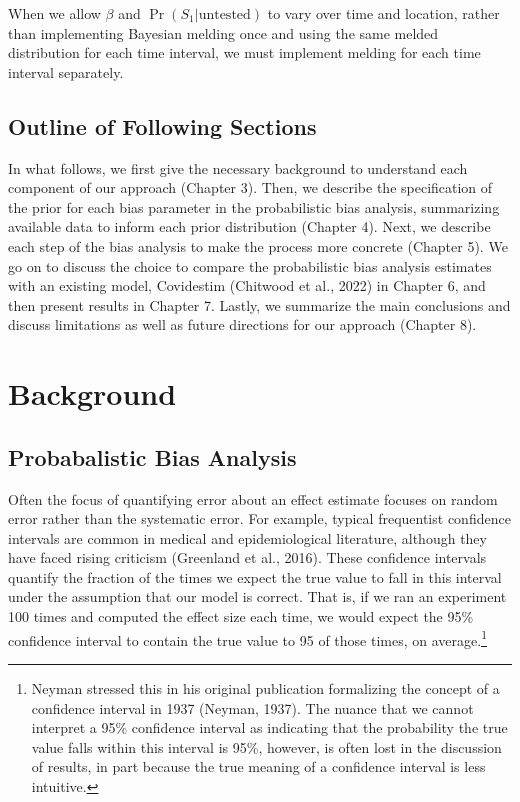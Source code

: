 \documentclass[12pt,twoside]{smiththesis}
\begin{document}
When we allow \(\beta\) and \(\Pr(S_1|\text{untested})\) to vary over time and location, rather than implementing Bayesian melding once and using the same melded distribution for each time interval, we must implement melding for each time interval separately.

\hypertarget{outline-of-following-sections}{%
\section{Outline of Following Sections}\label{outline-of-following-sections}}

In what follows, we first give the necessary background to understand each component of our approach (Chapter 3). Then, we describe the specification of the prior for each bias parameter in the probabilistic bias analysis, summarizing available data to inform each prior distribution (Chapter 4). Next, we describe each step of the bias analysis to make the process more concrete (Chapter 5). We go on to discuss the choice to compare the probabilistic bias analysis estimates with an existing model, Covidestim (Chitwood et al., 2022) in Chapter 6, and then present results in Chapter 7. Lastly, we summarize the main conclusions and discuss limitations as well as future directions for our approach (Chapter 8).

\hypertarget{background}{%
\chapter{Background}\label{background}}

\hypertarget{probabalistic-bias-analysis}{%
\section{Probabalistic Bias Analysis}\label{probabalistic-bias-analysis}}

Often the focus of quantifying error about an effect estimate focuses on random error rather than the systematic error. For example, typical frequentist confidence intervals are common in medical and epidemiological literature, although they have faced rising criticism (Greenland et al., 2016). These confidence intervals quantify the fraction of the times we expect the true value to fall in this interval under the assumption that our model is correct. That is, if we ran an experiment 100 times and computed the effect size each time, we would expect the 95\% confidence interval to contain the true value to 95 of those times, on average.\footnote{Neyman stressed this in his original publication formalizing the concept of a confidence interval in 1937 (Neyman, 1937). The nuance that we cannot interpret a 95\% confidence interval as indicating that the probability the true value falls within this interval is 95\%, however, is often lost in the discussion of results, in part because the true meaning of a confidence interval is less intuitive.}
\end{document}

